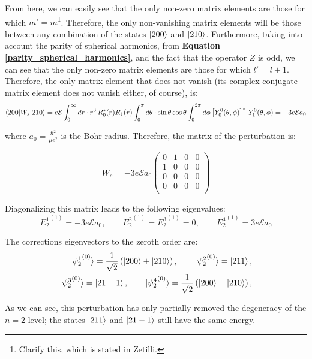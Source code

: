 From here, we can easily see that the only non-zero matrix elements are those for which $m' = m$\footnote{Clarify this, which is stated in Zetilli.}. Therefore, the only non-vanishing matrix elements will be those between any combination of the states $\ket{200}$ and $\ket{210}$. Furthermore, taking into account the parity of spherical harmonics, from \textbf{Equation \ref{parity_spherical_harmonics}}, and the fact that the operator $Z$ is odd, we can see that the only non-zero matrix elements are those for which $l' = l\pm 1$. Therefore, the only matrix element that does not vanish (its complex conjugate matrix element does not vanish either, of course), is:
\begin{equation}
    \begin{split}
        \braket{200|W_s|210} &= e\mathcal{E} \int_{0}^{\infty}dr\cdot r^3\, R_0^*(r)R_1(r)\int_{0}^{\pi}d\theta\cdot \sin\theta\cos\theta\int_{0}^{2\pi}d\phi \left[Y_0^0(\theta, \phi)\right]^*\, Y_1^0(\theta, \phi) = -3e\mathcal{E}a_0\\
    \end{split}
\end{equation}

where $a_0 = \frac{\hbar^2}{\mu e^2}$ is the Bohr radius. Therefore, the matrix of the perturbation is:

\begin{equation}
    W_s = -3e\mathcal{E}a_0\begin{pmatrix}
        0 & 1 & 0 & 0 \\
        1 & 0 & 0 & 0 \\
        0 & 0 & 0 & 0 \\
        0 & 0 & 0 & 0 \\
    \end{pmatrix}
\end{equation}

Diagonalizing this matrix leads to the following eigenvalues:
\begin{equation}
    {E_2^1}^{(1)} = -3e\mathcal{E}a_0,\qquad {E_2^2}^{(1)} = {E_2^3}^{(1)} = 0, \qquad {E_2^4}^{(1)} = 3e\mathcal{E}a_0
\end{equation}

The corrections eigenvectors to the zeroth order are:
\begin{equation}
    \begin{split}
        \ket{{\psi_2^1}^{(0)}} = \frac{1}{\sqrt{2}} \left(\ket{200} + \ket{210}\right), \qquad \ket{{\psi_2^2}^{(0)}} = \ket{211},\\
        \ket{{\psi_2^3}^{(0)}} = \ket{21-1}, \qquad \ket{{\psi_2^4}^{(0)}} = \frac{1}{\sqrt{2}} \left(\ket{200} - \ket{210}\right),\\
    \end{split}
\end{equation}

As we can see, this perturbation has only partially removed the degeneracy of the $n= 2$ level; the states $\ket{211}$ and $\ket{21-1}$ still have the same energy.
